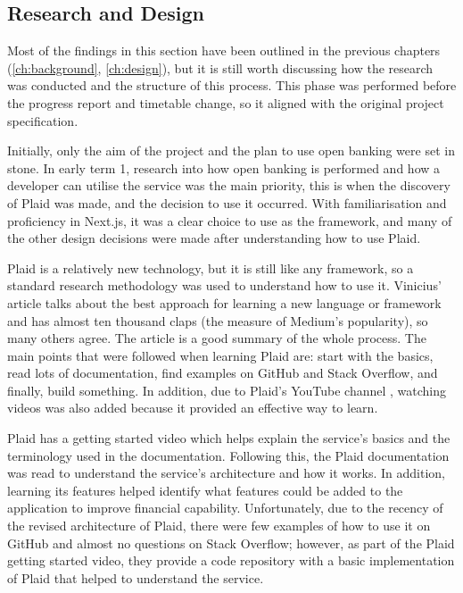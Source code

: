 \subsection{Research and Design}
Most of the findings in this section have been outlined in the previous chapters (\ref{ch:background}, \ref{ch:design}), but it is still worth discussing how the research was conducted and the structure of this process. This phase was performed before the progress report and timetable change, so it aligned with the original project specification.

Initially, only the aim of the project and the plan to use open banking were set in stone. In early term 1, research into how open banking is performed and how a developer can utilise the service was the main priority, this is when the discovery of Plaid was made, and the decision to use it occurred. With familiarisation and proficiency in Next.js, it was a clear choice to use as the framework, and many of the other design decisions were made after understanding how to use Plaid.

Plaid is a relatively new technology, but it is still like any framework, so a standard research methodology was used to understand how to use it. Vinicius' article \cite{FrameworkLearning} talks about the best approach for learning a new language or framework and has almost ten thousand claps (the measure of Medium's popularity), so many others agree. The article is a good summary of the whole process. The main points that were followed when learning Plaid are: start with the basics, read lots of documentation, find examples on GitHub and Stack Overflow, and finally, build something. In addition, due to Plaid's YouTube channel \cite{PlaidYouTube}, watching videos was also added because it provided an effective way to learn.

Plaid has a getting started video which helps explain the service's basics and the terminology used in the documentation. Following this, the Plaid documentation was read to understand the service's architecture and how it works. In addition, learning its features helped identify what features could be added to the application to improve financial capability. Unfortunately, due to the recency of the revised architecture of Plaid, there were few examples of how to use it on GitHub and almost no questions on Stack Overflow; however, as part of the Plaid getting started video, they provide a code repository with a basic implementation of Plaid that helped to understand the service.

